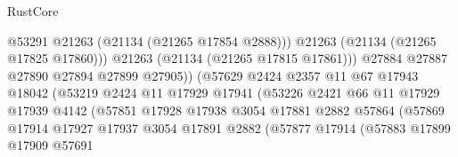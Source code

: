 \begin{lexlean}{RustCore}
\begin{coremodule}
                                              @53291
                                              @21263
                                              (@21134 (@21265 @17854 @2888)))
                                            @21263
                                            (@21134 (@21265 @17825 @17860)))
                                          @21263
                                          (@21134 (@21265 @17815 @17861)))
                                        @27884
                                        @27887
                                        @27890
                                        @27894
                                        @27899
                                        @27905))
                                    (@57629
                                      @2424
                                      @2357
                                      @11
                                      @67
                                      @17943
                                      @18042
                                      (@53219
                                        @2424
                                        @11
                                        @17929
                                        @17941
                                        (@53226
                                          @2421
                                          @66
                                          @11
                                          @17929
                                          @17939
                                          @4142
                                          (@57851
                                            @17928
                                            @17938
                                            @3054
                                            @17881
                                            @2882
                                            @57864
                                            (@57869
                                              @17914
                                              @17927
                                              @17937
                                              @3054
                                              @17891
                                              @2882
                                              (@57877
                                                @17914
                                                (@57883
                                                  @17899
                                                  @17909
                                                  @57691

\end{coremodule}
\end{lexlean}
